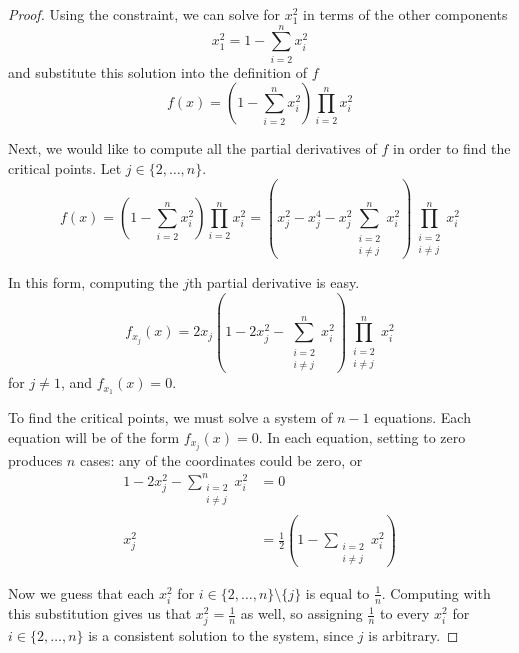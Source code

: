 \documentclass[letterpaper,11pt]{article}
\newcommand{\parens}[1]{\left(#1\right)}
\begin{document}
\begin{proof}
  Using the constraint, we can solve for $x_1^2$ in terms of the other
  components
  \begin{equation*}
    x_1^2 = 1 - \sum_{i=2}^n x_i^2
  \end{equation*}
  and substitute this solution into the definition of $f$
  \begin{equation*}
    f(x) = \parens{1 - \sum_{i=2}^n x_i^2} \prod_{i=2}^n x_i^2
  \end{equation*}

  Next, we would like to compute all the partial derivatives of $f$ in order to
  find the critical points. Let $j \in \{2, \ldots, n\}$.
  \begin{equation*}
    f(x) = \parens{1 - \sum_{i=2}^n x_i^2} \prod_{i=2}^n x_i^2
    = \parens{x_j^2 - x_j^4 - x_j^2 \sum_{\substack{i=2 \\ i \neq j}}^n x_i^2}
      \prod_{\substack{i=2 \\ i \neq j}}^n x_i^2
  \end{equation*}

  In this form, computing the $j$th partial derivative is easy.
  \begin{equation*}
    f_{x_j}(x)
    = 2 x_j
      \parens{1 - 2 x_j^2 - \sum_{\substack{i=2 \\ i \neq j}}^n x_i^2}
      \prod_{\substack{i=2 \\ i \neq j}}^n x_i^2
  \end{equation*}
  for $j \neq 1$, and $f_{x_1}(x) = 0$.

  To find the critical points, we must solve a system of $n - 1$ equations.
  Each equation will be of the form $f_{x_j}(x) = 0$.
  In each equation, setting to zero produces $n$ cases: any of the coordinates
  could be zero, or
  \begin{align*}
    1 - 2 x_j^2 - \sum_{\substack{i=2 \\ i \neq j}}^n x_i^2 & = 0 \\
    x_j^2 & = \frac{1}{2}\parens{1 - \sum_{\substack{i=2 \\ i \neq j}} x_i^2}
  \end{align*}

  Now we guess that each $x_i^2$ for $i \in \{2, \ldots, n\} \setminus \{j\}$
  is equal to $\frac{1}{n}$. Computing with this substitution gives us that
  $x_j^2 = \frac{1}{n}$ as well, so assigning $\frac{1}{n}$ to every $x_i^2$
  for $i \in \{2, \ldots, n\}$ is a consistent solution to the system, since
  $j$ is arbitrary.


\end{proof}
\end{document}
